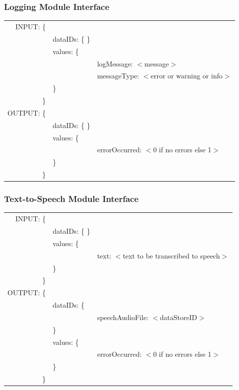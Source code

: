 \documentclass[onecolumn, draftclsnofoot,10pt, compsoc]{IEEEtran}
\begin{document}
        \subsubsection{Logging Module Interface}
            \begin{tabular}[t]{r l p{4.5in}}
                INPUT: \{ & & \\
                & dataIDs: \{ \} & \\
                & values: \{ & \\
                & & logMessage: $<$message$>$ \\
                & & messageType: $<$error or warning or info$>$ \\
                & \} & \\
                \} & & \\
                OUTPUT: \{ & & \\
                & dataIDs: \{ \} & \\
                & values: \{ & \\
                & & errorOccurred: $<$0 if no errors else 1$>$ \\
                & \} & \\
                \} & & \\
            \end{tabular}

         \subsubsection{Text-to-Speech Module Interface}
            \begin{tabular}[t]{r l p{4.5in}}
                INPUT: \{ & & \\
                & dataIDs: \{ \} & \\
                & values: \{ & \\
                & & text: $<$text to be transcribed to speech$>$ \\
                & \} & \\
                \} & & \\
                OUTPUT: \{ & & \\
                & dataIDs: \{ & \\
                & & speechAudioFile: $<$dataStoreID$>$ \\
                & \} & \\
                & values: \{ & \\
                & & errorOccurred: $<$0 if no errors else 1$>$ \\
                & \} & \\
                \} & & \\
            \end{tabular}
\end{document}
